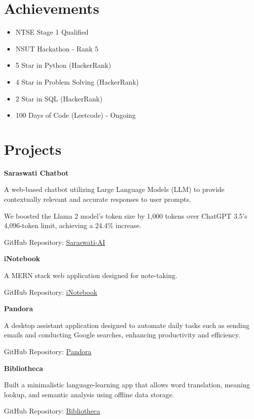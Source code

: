 \documentclass[letterpaper,10pt]{article}
\newcommand{\heading}[2]{
  \hspace{10pt}#1\hfill#2\\
}
\newcommand{\headingBf}[2]{
  \heading{\textbf{#1}}{\textbf{#2}}
}
\newenvironment{resume_list}{
  \vspace{-7pt}
  \begin{itemize}[itemsep=-2px, parsep=1pt, leftmargin=30pt]
}{
  \end{itemize}
}
\begin{document}
  \section{Achievements}
  \begin{multicols}{2}
    \begin{itemize}[itemsep=0px,parsep=1pt]
      \item NTSE Stage 1 Qualified
      \item NSUT Hackathon - Rank 5
      \item 5 Star in Python (HackerRank)
      \item 4 Star in Problem Solving (HackerRank)
      \item 2 Star in SQL (HackerRank)
      \item 100 Days of Code (Leetcode) - Ongoing
    \end{itemize} 
  \end{multicols}

  \section{Projects}

  \headingBf{Saraswati Chatbot}{}
  \begin{resume_list}
    \item A web-based chatbot utilizing Large Language Models (LLM) to provide contextually relevant and accurate responses to user prompts.
    \item We boosted the Llama 2 model's token size by 1,000 tokens over ChatGPT 3.5's 4,096-token limit, achieving a 24.4\% increase.
    \item GitHub Repository: \href{https://github.com/larrikin-coder/Saraswati-AI.git}{Saraswati-AI}
   
  \end{resume_list}

  \headingBf{iNotebook}{}
  \begin{resume_list}
    \item A MERN stack web application designed for note-taking.
    \item GitHub Repository: \href{https://github.com/larrikin-coder/iNotebook.git}{iNotebook}    
  \end{resume_list}

  \headingBf{Pandora}{}
  \begin{resume_list}
    \item A desktop assistant application designed to automate daily tasks such as sending emails and conducting Google searches, enhancing productivity and efficiency.
    \item GitHub Repository: \href{https://github.com/larrikin-coder/Pandora-Ai.git}{Pandora}
  \end{resume_list}

  \headingBf{Bibliotheca}{}
  \begin{resume_list}
    \item Built a minimalistic language-learning app that allows word translation, meaning lookup, and semantic analysis using offline data storage.
    \item GitHub Repository: \href{https://github.com/larrikin-coder/Bibliotheca.git}{Bibliotheca}
  \end{resume_list}
\end{document}
